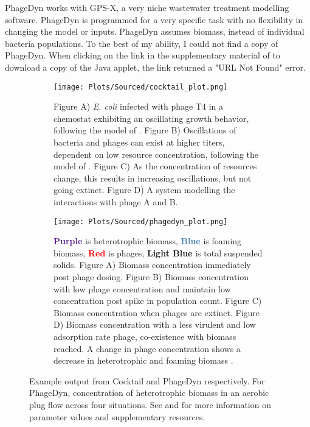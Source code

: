 PhageDyn works with GPS-X, a very niche wastewater treatment modelling software. 
PhageDyn is programmed for a very specific task with no flexibility in changing the model or inputs. 
PhageDyn assumes biomass, instead of individual bacteria populations. 
To the best of my ability, I could not find a copy of PhageDyn. 
When clicking on the link in the supplementary material of \citet{krysiak-baltynSimulationPhageDynamics2017} to download a copy of the Java applet, the link returned a "URL Not Found" error. 

\begin{figure}
    \centering
    \begin{subfigure}{0.49\linewidth}
        \centering
        \captionsetup{width=1\linewidth}
        \texttt{[image: Plots/Sourced/cocktail\_plot.png]}
        \caption{
            Figure A) \textit{E. coli} infected with phage T4 in a chemostat exhibiting an oscillating growth behavior, following the model of \citet{bohannanEffectResourceEnrichment1997}. 
            Figure B) Oscillations of bacteria and phages can exist at higher titers, dependent on low resource concentration, following the model of \citet{lenskiDynamicsInteractionsBacteria1988}. 
            Figure C) As the concentration of resources change, this results in increasing oscillations, but not going extinct. 
            Figure D) A system modelling the interactions with phage A and B. 
        }
        \label{fig:sourced:cocktail_plot}
    \end{subfigure}
    \hfill
    \begin{subfigure}{0.49\linewidth}
        \centering
        \captionsetup{width=1\linewidth}
        \texttt{[image: Plots/Sourced/phagedyn\_plot.png]}
        \caption{
            \textcolor[HTML]{551A8C}{\textbf{Purple}} is heterotrophic biomass, 
            \textcolor[HTML]{4580B4}{\textbf{Blue}} is foaming biomass, 
            \textcolor[HTML]{FF0000}{\textbf{Red}} is phages, 
            \textcolor[HTML]{01E6EE}{\textbf{Light Blue}} is total suspended solids. 
            Figure A) Biomass concentration immediately post phage dosing. 
            Figure B) Biomass concentration with low phage concentration and maintain low concentration post spike in population count. 
            Figure C) Biomass concentration when phages are extinct. 
            Figure D) Biomass concentration with a less virulent and low adsorption rate phage, co-existence with biomass reached. 
            A change in phage concentration shows a decrease in heterotrophic and foaming biomass \cite{krysiak-baltynSimulationPhageDynamics2017}. 
        }
        \label{fig:sourced:phagedyn_plot}
    \end{subfigure}
    \caption{Example output from Cocktail and PhageDyn respectively. For PhageDyn, concentration of heterotrophic biomass in an aerobic plug flow across four situations.
        See \citet{nilssonCocktailComputerProgram2022} and \citet{krysiak-baltynSimulationPhageDynamics2017} for more information on parameter values and supplementary resources. 
    }
    \label{fig:sourced:cocktail_and_phagedyn}
\end{figure}

